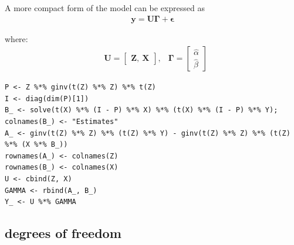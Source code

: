\documentclass[10pt, twoside, openleft]{article}
\newcommand{\alphahat}{\hat{\alpha}} %
\newcommand{\betahat}{\hat{\beta}} %
\begin{document}
\noindent
A more compact form of the model can be expressed as
\begin{equation*}
\begin{aligned}
\mathbf{y} = \mathbf{U} \mathbf{\Gamma} + \mathbf{\epsilon}
\end{aligned}
\end{equation*}
\smallskip

where:
\begin{equation*}
\begin{aligned}
& \mathbf{U} =
\left[ \begin{array}{c}
    \mathbf{Z}, \ \mathbf{X}
\end{array}\right],
& \mathbf{\Gamma} =
\left[ \begin{array}{c}
    \alphahat \\
    \betahat
\end{array}\right]
\end{aligned}
\end{equation*}
\smallskip

\begin{verbatim}
P <- Z %*% ginv(t(Z) %*% Z) %*% t(Z)
I <- diag(dim(P)[1])
B_ <- solve(t(X) %*% (I - P) %*% X) %*% (t(X) %*% (I - P) %*% Y); colnames(B_) <- "Estimates"
A_ <- ginv(t(Z) %*% Z) %*% (t(Z) %*% Y) - ginv(t(Z) %*% Z) %*% (t(Z) %*% (X %*% B_))
rownames(A_) <- colnames(Z)
rownames(B_) <- colnames(X)
U <- cbind(Z, X)
GAMMA <- rbind(A_, B_)
Y_ <- U %*% GAMMA
\end{verbatim}

\begin{center}
\subsection{degrees of freedom}
\vspace{-3ex}
\end{center}
\end{document}
